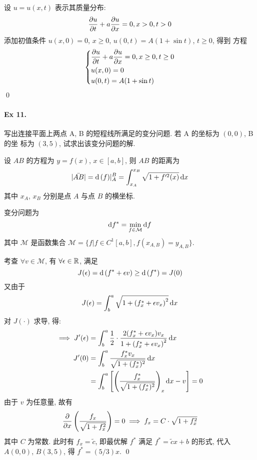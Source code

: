\begin{solution}
设 $u = u(x, t)$ 表示其质量分布:
\[
{\frac{\partial {u}}{\partial {t}}} + a{\frac{\partial {u}}{\partial {x}}} = 0, x > 0, t > 0
\]
添加初值条件 $u(x, 0) = 0$, $x \geq 0$, $u(0, t) = A(1+\sin t)$, $t\geq 0$, 得到
方程
\[ \left\{ \begin{aligned} 
&{\frac{\partial {u}}{\partial {t}}} + a{\frac{\partial {u}}{\partial {x}}} = 0,
    x \geq 0, t \geq 0 \\
&u(x, 0) = 0 \\
&u(0, t) = A(1+\sin t)
\end{aligned} \right. \]
\qed
\end{solution}
\paragraph{Ex 11.}
写出连接平面上两点 A, B 的短程线所满足的变分问题. 若 A 的坐标为 $(0, 0)$, B 的坐
标为 $(3, 5)$, 试求出该变分问题的解.

\begin{solution}
设 $AB$ 的方程为 $y = f(x)$, $x \in [a, b]$, 则 $AB$ 的距离为
\[
|\bar{AB}| = \operatorname{d\!}\ (f)|_A^B = \int_{x_A}^{x_B} \sqrt{1 + f'^2(x)} \operatorname{d\!} x
\]
其中 $x_A$, $x_B$ 分别是点 $A$ 与点 $B$ 的横坐标.

变分问题为 
\[ \operatorname{d\!} f^* = \min_{f \in \mathcal M} \operatorname{d\!} f \]
其中 $\mathcal M$ 是函数集合
$\mathcal M = \{f | f \in C^1[a, b], f(x_{A, B}) = y_{A, B}\}$.

考查 $\forall v \in \mathcal M$, 有 $\forall \epsilon \in {\mathbb R}$, 满足
\[ J(\epsilon) = \operatorname{d\!}\ (f^* + \epsilon v) \geq \operatorname{d\!}\ (f^*) = J(0) \]
又由于
\[
J(\epsilon) = \int_b^a \sqrt{1 + \left(f^*_x + \epsilon v_x\right)^2} \operatorname{d\!} x
\]
对 $J(\cdot)$ 求导, 得:
\begin{align*}
\implies J'(\epsilon)
&= \int_b^a \frac{1}{2} \cdot
  \frac{2 (f^*_x + \epsilon v_x) v_x}{1 + \left(f^*_x + \epsilon v_x\right)^2}
  \operatorname{d\!} x \\
J'(0) &= \int_b^a
  \frac{f^*_x v_x}{\sqrt{1 + (f^*_x)^2}} \operatorname{d\!} x \\
&= \int_b^a
  \left[ \left( \frac{f^*_x}{\sqrt{1 + (f^*_x)^2}} \right)_x \operatorname{d\!} x - v \right]
  = 0
\end{align*}
由于 $v$ 为任意量, 故有
\[
{{\frac{\partial {}}{\partial {x}}}}\left( \frac{f_x}{\sqrt{1 + f_x^2}} \right) = 0
\implies f_x = C \cdot \sqrt{1 + f_x^2}
\]
其中 $C$ 为常数. 此时有 $f_x = \tilde c$, 即最优解 $f^*$ 满足
$f^* = \tilde c x + b$ 的形式, 代入 $A(0, 0)$, $B(3, 5)$, 得 $f^* = (5 / 3) x$.
\qed
\end{solution}
